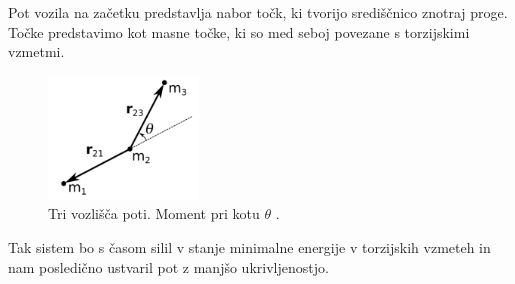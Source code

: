 \documentclass[10pt,a4paper]{article}
\begin{document}
Pot vozila na začetku predstavlja nabor točk, ki tvorijo središčnico znotraj proge. Točke predstavimo kot masne točke, ki so med seboj povezane s torzijskimi vzmetmi.

\begin{figure}[H]
	\centering
	\includegraphics[width=4cm]{pic/slika5.png}
	\caption{Tri vozlišča poti. Moment pri kotu $\theta$ \cite{vir9}.}
	\label{fig:slika}
\end{figure}

Tak sistem bo s časom silil v stanje minimalne energije v torzijskih vzmeteh in nam posledično ustvaril pot z manjšo ukrivljenostjo.
\end{document}
